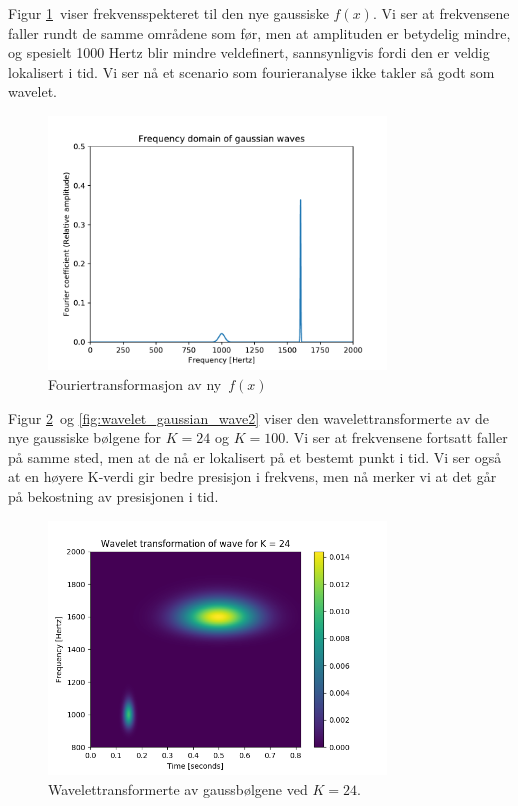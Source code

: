 \documentclass[11pt,norsk]{article}
\begin{document}
Figur \ref{fig:FT_gaussian_wave} viser frekvensspekteret til den nye gaussiske $f(x)$. Vi ser at frekvensene faller rundt de samme områdene som før, men at amplituden er betydelig mindre, og spesielt 1000 Hertz blir mindre veldefinert, sannsynligvis fordi den er veldig lokalisert i tid. Vi ser nå et scenario som fourieranalyse ikke takler så godt som wavelet.
\begin{figure}[H]
\centering
\includegraphics[width=0.8\textwidth]{fig/FT_gaussian_wave.pdf}
\caption{Fouriertransformasjon av ny $f(x)$}
\label{fig:FT_gaussian_wave}
\end{figure}

Figur \ref{fig:wavelet_gaussian_wave1} og \ref{fig:wavelet_gaussian_wave2} viser den wavelettransformerte av de nye gaussiske bølgene for $K = 24$ og $K = 100$. Vi ser at frekvensene fortsatt faller på samme sted, men at de nå er lokalisert på et bestemt punkt i tid. Vi ser også at en høyere K-verdi gir bedre presisjon i frekvens, men nå merker vi at det går på bekostning av presisjonen i tid.
\begin{figure}[H]
\centering
\includegraphics[width=0.8\textwidth]{fig/wavelet_gaussian_k=24.png}
\caption{Wavelettransformerte av gaussbølgene ved $K = 24$.}
\label{fig:wavelet_gaussian_wave1}
\end{figure}
\end{document}
